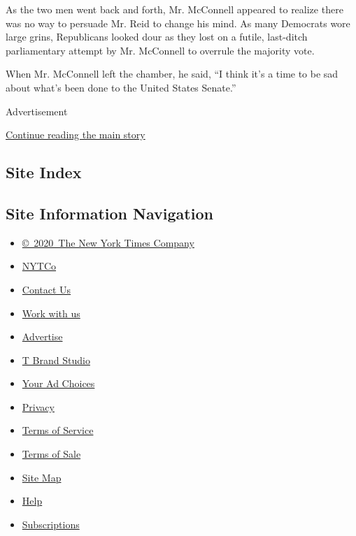 As the two men went back and forth, Mr. McConnell appeared to realize
there was no way to persuade Mr. Reid to change his mind. As many
Democrats wore large grins, Republicans looked dour as they lost on a
futile, last-ditch parliamentary attempt by Mr. McConnell to overrule
the majority vote.

When Mr. McConnell left the chamber, he said, ``I think it's a time to
be sad about what's been done to the United States Senate.''

Advertisement

\protect\hyperlink{after-bottom}{Continue reading the main story}

\hypertarget{site-index}{%
\subsection{Site Index}\label{site-index}}

\hypertarget{site-information-navigation}{%
\subsection{Site Information
Navigation}\label{site-information-navigation}}

\begin{itemize}
\tightlist
\item
  \href{https://help.nytimes.com/hc/en-us/articles/115014792127-Copyright-notice}{©~2020~The
  New York Times Company}
\end{itemize}

\begin{itemize}
\tightlist
\item
  \href{https://www.nytco.com/}{NYTCo}
\item
  \href{https://help.nytimes.com/hc/en-us/articles/115015385887-Contact-Us}{Contact
  Us}
\item
  \href{https://www.nytco.com/careers/}{Work with us}
\item
  \href{https://nytmediakit.com/}{Advertise}
\item
  \href{http://www.tbrandstudio.com/}{T Brand Studio}
\item
  \href{https://www.nytimes.com/privacy/cookie-policy\#how-do-i-manage-trackers}{Your
  Ad Choices}
\item
  \href{https://www.nytimes.com/privacy}{Privacy}
\item
  \href{https://help.nytimes.com/hc/en-us/articles/115014893428-Terms-of-service}{Terms
  of Service}
\item
  \href{https://help.nytimes.com/hc/en-us/articles/115014893968-Terms-of-sale}{Terms
  of Sale}
\item
  \href{https://spiderbites.nytimes.com}{Site Map}
\item
  \href{https://help.nytimes.com/hc/en-us}{Help}
\item
  \href{https://www.nytimes.com/subscription?campaignId=37WXW}{Subscriptions}
\end{itemize}
